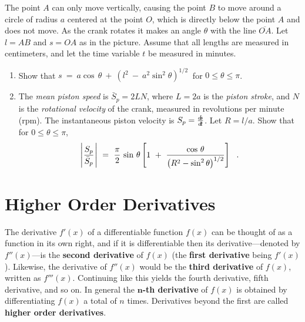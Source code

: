 {\begin{enumerate}[\bfseries 1.]
The point $A$ can only move vertically, causing the point $B$ to move around a circle
of radius $a$ centered at the point $O$, which is directly below the point $A$ and
does not move. As the crank rotates it makes an
angle $\theta$ with the line $\overline{OA}$. Let $l = AB$ and $s = OA$ as in
the picture. Assume that all lengths are measured in centimeters, and let the time
variable $t$ be measured in minutes.
 \begin{enumerate}[\bfseries (a)]
  \item Show that $s ~=~ a \cos\,\theta ~+~ \left(l^2 ~-~ a^2 \sin^2\theta\right)^{1/2}~$
  for $0 \le \theta \le \pi$.
  \item The \emph{mean piston speed} is $\bar{S}_p = 2LN$, where $L = 2a$ is the
   \emph{piston stroke}, and $N$ is the \emph{rotational velocity} of
   the crank, measured in revolutions per minute (rpm). The instantaneous piston velocity
   is $S_p = \frac{d\negmedspace s}{d\!t}$. Let $R = l/a$. Show that for $0 \le \theta \le \pi$,
\begin{displaymath}
 \Biggl\lvert\mspace{1mu}\frac{S_p}{\bar{S}_p}\mspace{1mu}\Biggr\rvert ~=~ \frac{\pi}{2}\,\sin\,\theta
 \left[1 ~+~ \frac{\cos\,\theta}{\left(R^2 - \sin^2\theta\right)^{1/2}}\right] ~~.
\end{displaymath}
 \end{enumerate}
\end{enumerate}}
\newpage
\section{Higher Order Derivatives}\label{sec:higher-order-derivatives}
The derivative $f'(x)$ of a differentiable function $f(x)$ can be thought of as
a function in its own right, and if it is differentiable then its
derivative---denoted by $f''(x)$---is the
\textbf{second derivative} of $f(x)$ (the
\textbf{first derivative} being $f'(x)$). Likewise, the
derivative of $f''(x)$ would be the \textbf{third derivative} of $f(x)$, written
as $f'''(x)$. Continuing like this yields the fourth derivative, fifth
derivative, and so on. In general the
\textbf{$\bm{n}$-th derivative} of $f(x)$ is
obtained by differentiating $f(x)$ a total of $n$ times. Derivatives beyond the
first are called \textbf{higher order derivatives}.

